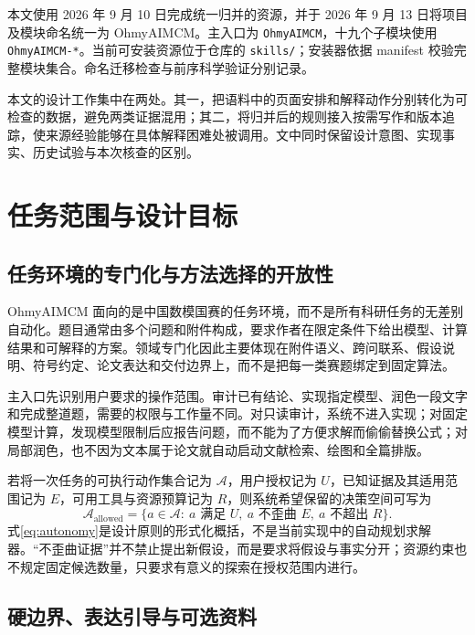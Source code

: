 \documentclass[UTF8,a4paper,zihao=-4,fontset=fandol]{ctexart}
\newcommand{\sys}{\textsf{OhmyAIMCM}}
\newcommand{\code}[1]{\texttt{\small #1}}
\begin{document}
本文使用 2026 年 9 月 10 日完成统一归并的资源，并于 2026 年 9 月 13 日将项目及模块命名统一为 OhmyAIMCM。主入口为 \code{OhmyAIMCM}，十九个子模块使用 \code{OhmyAIMCM-*}。当前可安装资源位于仓库的 \code{skills/}；安装器依据 manifest 校验完整模块集合。命名迁移检查与前序科学验证分别记录。

本文的设计工作集中在两处。其一，把语料中的页面安排和解释动作分别转化为可检查的数据，避免两类证据混用；其二，将归并后的规则接入按需写作和版本追踪，使来源经验能够在具体解释困难处被调用。文中同时保留设计意图、实现事实、历史试验与本次核查的区别。

\section{任务范围与设计目标}

\subsection{任务环境的专门化与方法选择的开放性}

\sys{} 面向的是中国数模国赛的任务环境，而不是所有科研任务的无差别自动化。题目通常由多个问题和附件构成，要求作者在限定条件下给出模型、计算结果和可解释的方案。领域专门化因此主要体现在附件语义、跨问联系、假设说明、符号约定、论文表达和交付边界上，而不是把每一类赛题绑定到固定算法。

主入口先识别用户要求的操作范围。审计已有结论、实现指定模型、润色一段文字和完成整道题，需要的权限与工作量不同。对只读审计，系统不进入实现；对固定模型计算，发现模型限制后应报告问题，而不能为了方便求解而偷偷替换公式；对局部润色，也不因为文本属于论文就自动启动文献检索、绘图和全篇排版。

若将一次任务的可执行动作集合记为 $\mathcal A$，用户授权记为 $U$，已知证据及其适用范围记为 $E$，可用工具与资源预算记为 $R$，则系统希望保留的决策空间可写为
\begin{equation}
\mathcal A_{\mathrm{allowed}}=\{a\in\mathcal A:\ a\text{ 满足 }U,\ a\text{ 不歪曲 }E,\ a\text{ 不超出 }R\}.
\label{eq:autonomy}
\end{equation}
式\eqref{eq:autonomy}是设计原则的形式化概括，不是当前实现中的自动规划求解器。“不歪曲证据”并不禁止提出新假设，而是要求将假设与事实分开；资源约束也不规定固定候选数量，只要求有意义的探索在授权范围内进行。

\subsection{硬边界、表达引导与可选资料}
\end{document}
